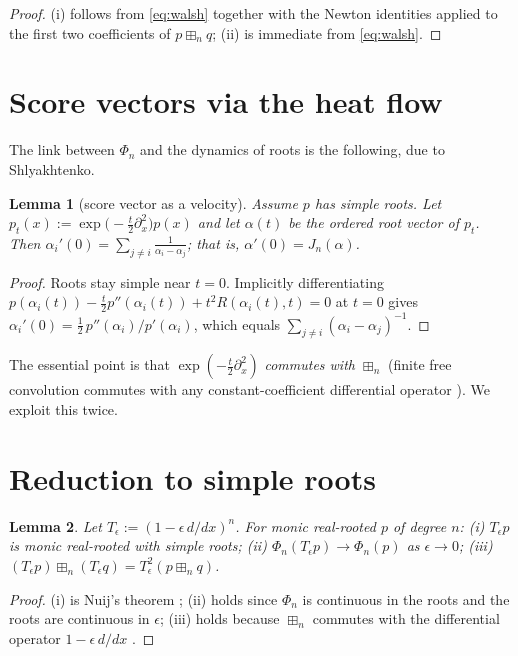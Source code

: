 \documentclass[11pt]{article}
\newcommand{\bn}{\boxplus_n}
\newcommand{\score}{J_n}
\newtheorem{lemma}{Lemma}
\theoremstyle{definition}
\begin{document}
\begin{proof}
(i) follows from \eqref{eq:walsh} together with the Newton identities applied
to the first two coefficients of $p\bn q$; (ii) is immediate from
\eqref{eq:walsh}.
\end{proof}

\section*{Score vectors via the heat flow}

The link between $\Phi_n$ and the dynamics of roots is the following, due to
Shlyakhtenko.

\begin{lemma}[score vector as a velocity]\label{lem:heat}
Assume $p$ has simple roots. Let $p_t(x):=\exp\!\bigl(-\tfrac{t}{2}\partial_x^2\bigr)p(x)$
and let $\alpha(t)$ be the ordered root vector of $p_t$. Then
$\alpha_i'(0)=\sum_{j\ne i}\frac{1}{\alpha_i-\alpha_j}$; that is,
$\alpha'(0)=\score(\alpha)$.
\end{lemma}

\begin{proof}
Roots stay simple near $t=0$. Implicitly differentiating
$p(\alpha_i(t))-\tfrac{t}{2}p''(\alpha_i(t))+t^2R(\alpha_i(t),t)=0$ at $t=0$
gives $\alpha_i'(0)=\tfrac12\,p''(\alpha_i)/p'(\alpha_i)$, which equals
$\sum_{j\ne i}(\alpha_i-\alpha_j)^{-1}$.
\end{proof}

The essential point is that $\exp(-\tfrac t2\partial_x^2)$ \emph{commutes with}
$\bn$ (finite free convolution commutes with any constant-coefficient
differential operator \cite{MSS22}). We exploit this twice.

\section*{Reduction to simple roots}

\begin{lemma}\label{lem:simple}
Let $T_\epsilon:=(1-\epsilon\,d/dx)^n$. For monic real-rooted $p$ of degree $n$:
(i) $T_\epsilon p$ is monic real-rooted with simple roots; (ii)
$\Phi_n(T_\epsilon p)\to\Phi_n(p)$ as $\epsilon\to0$; (iii)
$(T_\epsilon p)\bn(T_\epsilon q)=T_\epsilon^2(p\bn q)$.
\end{lemma}

\begin{proof}
(i) is Nuij's theorem \cite{Nuij}; (ii) holds since $\Phi_n$ is continuous in
the roots and the roots are continuous in $\epsilon$; (iii) holds because $\bn$
commutes with the differential operator $1-\epsilon\,d/dx$ \cite{MSS22}.
\end{proof}
\end{document}

